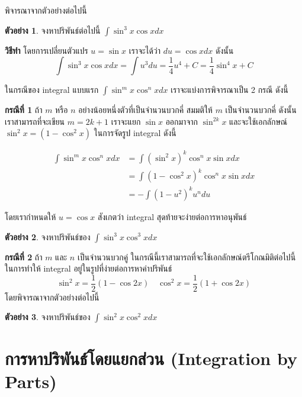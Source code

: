 \documentclass[
]{book}
\theoremstyle{definition}
\theoremstyle{definition}
\newtheorem{example}{ตัวอย่าง}[chapter]
\theoremstyle{definition}
\theoremstyle{definition}
\theoremstyle{remark}
\begin{document}
พิจารณาจากตัวอย่างต่อไปนี้

\begin{example}
จงหาปริพันธ์ต่อไปนี้ \(\int \sin^3 x \cos x dx\)
\end{example}

\textbf{วิธีทำ} โดยการเปลี่ยนตัวแปร \(u = \sin x\) เราจะได้ว่า \(du = \cos x dx\) ดังนั้น
\[\int \sin^3 x \cos x dx = \int u^3 du = \frac{1}{4}u^4 + C = \frac{1}{4} \sin ^4 x + C\]

ในกรณีของ integral แบบแรก \(\int \sin^m x \cos^n x dx\)
เราจะแบ่งการพิจารณาเป็น 2 กรณี ดังนี้

\textbf{กรณีที่ 1} ถ้า \(m\) หรือ \(n\) อย่างน้อยหนึ่งตัวที่เป็นจำนวนบวกคี่ สมมติให้ \(m\)
เป็นจำนวนบวกคี่ ดังนั้นเราสามารถที่จะเขียน \(m = 2k +1\) เราจะแยก \(\sin x\) ออกมาจาก
\(\sin^{2k} x\) และจะใช้เอกลักษณ์ \(\sin^2 x = (1 - \cos^2 x)\) ในการจัดรูป
integral ดังนี้  

\[\begin{aligned}
        \int \sin^m x \cos^n x dx &= \int (\sin^{2}x)^k \cos^n x \sin x dx \\
                                    &= \int (1 - \cos^2 x)^k \cos^n x \sin x dx \\
                                    &= - \int (1 - u^2)^k u^n du 
\end{aligned}\]

  โดยเรากำหนดให้ \(u = \cos x\) สังเกตว่า integral
สุดท้ายจะง่ายต่อการหาอนุพันธ์

\begin{example}
จงหาปริพันธ์ของ \(\int \sin^3 x \cos^3 x dx\)
\end{example}

\textbf{กรณีที่ 2} ถ้า \(m\) และ \(n\) เป็นจำนวนบวกคู่
ในกรณีนี้เราสามารถที่จะใช้เอกลักษณ์ตรีโกณมิติต่อไปนี้ในการทำให้ integral
อยู่ในรูปที่ง่ายต่อการหาค่าปริพันธ์
\[\sin^2 x = \frac{1}{2}(1-\cos 2x) \quad  \cos^2 x = \frac{1}{2}(1 + \cos 2x)\]
โดยพิจารณาจากตัวอย่างต่อไปนี้

\begin{example}
จงหาปริพันธ์ของ \(\int \sin^2 x \cos^2 x dx\)
\end{example}

\section{การหาปริพันธ์โดยแยกส่วน (Integration by Parts)}\label{uxe01uxe32uxe23uxe2buxe32uxe1buxe23uxe1euxe19uxe18uxe42uxe14uxe22uxe41uxe22uxe01uxe2auxe27uxe19-integration-by-parts}
\end{document}
